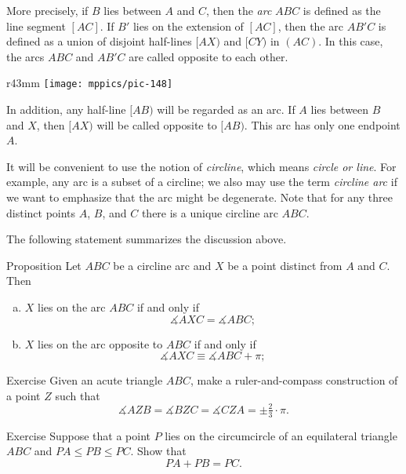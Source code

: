 More precisely, if $B$ lies between $A$ and $C$, then the {}\emph{arc} $ABC$ is defined as 
the line segment $[AC]$.
If $B'$ lies on the extension of $[AC]$,
then the arc $AB'C$ is defined as a union of disjoint half-lines $[AX)$ and $[CY)$ in $(AC)$.
In this case, the arcs $ABC$ and $AB'C$ are called opposite to each other.

\begin{wrapfigure}{r}{43mm}
\vskip-2mm
\centering
\texttt{[image: mppics/pic-148]}
\end{wrapfigure}

In addition, any half-line $[AB)$ will be regarded as an arc.
If $A$ lies between $B$ and $X$, then $[AX)$ will be called opposite to $[AB)$.
This arc has only one endpoint $A$.

It will be convenient to use the notion of 
\emph{circline},
which means \textit{circle or line}.
For example, any arc is a subset of a circline;
we also may use the term \emph{circline arc} if we want to emphasize that the arc might be degenerate.
Note that for any three distinct points $A$, $B$, and $C$ there is a unique circline arc $ABC$.

The following statement summarizes the discussion above.

\begin{thm}{Proposition}\label{prop:arcs}
Let $ABC$ be a circline arc and $X$ be a point distinct from $A$ and $C$.
Then 
\begin{enumerate}[(a)]
\item $X$ lies on the arc $ABC$ if and only if 
 \[\measuredangle AXC=\measuredangle ABC;\]
\item $X$ lies on the arc opposite to $ABC$ if and only if 
 \[\measuredangle AXC\equiv\measuredangle ABC+\pi;\]
\end{enumerate}
\end{thm}

\begin{thm}{Exercise}\label{ex:3x120}
Given an acute triangle $ABC$,
make a ruler-and-compass construction of a point $Z$ such that
\[\measuredangle AZB
= \measuredangle BZC
= \measuredangle CZA
=\pm\tfrac23\cdot\pi.\]

\end{thm}

\begin{thm}{Exercise}\label{ex:a+b=c}
Suppose that a point $P$ lies on the circumcircle of an equilateral triangle $ABC$
and $PA\le PB\le PC$.
Show that 
\[PA+PB=PC.\]
\end{thm}

